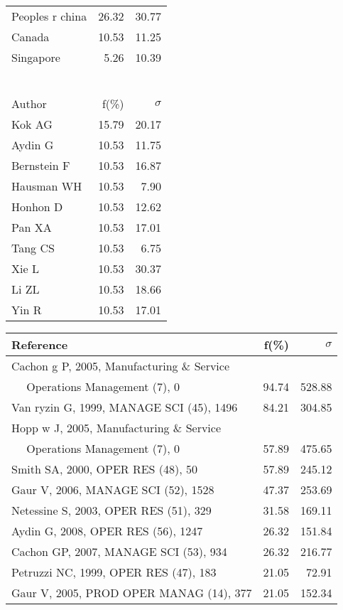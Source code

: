 \documentclass[a4paper,11pt]{report}
\begin{document}
\begin{landscape}
\begin{table}[!ht]
{\begin{tabular}{|l r r|}
Peoples r china & 26.32 & 30.77\\
Canada & 10.53 & 11.25\\
Singapore & 5.26 & 10.39\\
 &  & \\
 &  & \\
 &  & \\
 &  & \\
 &  & \\
 &  & \\
\hline
\hline
Author & f(\%) & $\sigma$\\
\hline
Kok AG & 15.79 & 20.17\\
Aydin G & 10.53 & 11.75\\
Bernstein F & 10.53 & 16.87\\
Hausman WH & 10.53 & 7.90\\
Honhon D & 10.53 & 12.62\\
Pan XA & 10.53 & 17.01\\
Tang CS & 10.53 & 6.75\\
Xie L & 10.53 & 30.37\\
Li ZL & 10.53 & 18.66\\
Yin R & 10.53 & 17.01\\
\hline
\end{tabular}
}
{\scriptsize\begin{tabular}{|l r r|}
\hline
Reference & f(\%) & $\sigma$\\
\hline
Cachon g P, 2005, Manufacturing \& Service &  & \\
$\quad$ Operations Management (7), 0 & 94.74 & 528.88\\
Van ryzin G, 1999, MANAGE SCI (45), 1496 & 84.21 & 304.85\\
Hopp w J, 2005, Manufacturing \& Service &  & \\
$\quad$ Operations Management (7), 0 & 57.89 & 475.65\\
Smith SA, 2000, OPER RES (48), 50 & 57.89 & 245.12\\
Gaur V, 2006, MANAGE SCI (52), 1528 & 47.37 & 253.69\\
Netessine S, 2003, OPER RES (51), 329 & 31.58 & 169.11\\
Aydin G, 2008, OPER RES (56), 1247 & 26.32 & 151.84\\
Cachon GP, 2007, MANAGE SCI (53), 934 & 26.32 & 216.77\\
Petruzzi NC, 1999, OPER RES (47), 183 & 21.05 & 72.91\\
Gaur V, 2005, PROD OPER MANAG (14), 377 & 21.05 & 152.34\\

\end{tabular}}
\end{table}
\end{landscape}
\end{document}
